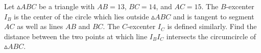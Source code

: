 Let $\vartriangle ABC$ be a triangle with $AB = 13$, $BC = 14$, and $AC = 15$. The $B$-excenter $I_B$ is the center of the circle which lies outside  $\vartriangle ABC$ and is tangent to segment $AC$ as well as lines $AB$ and $BC$. The $C$-excenter $I_C$ is defined similarly. Find the distance between the two points at which line $I_BI_C$ intersects the circumcircle of $\vartriangle ABC$.
